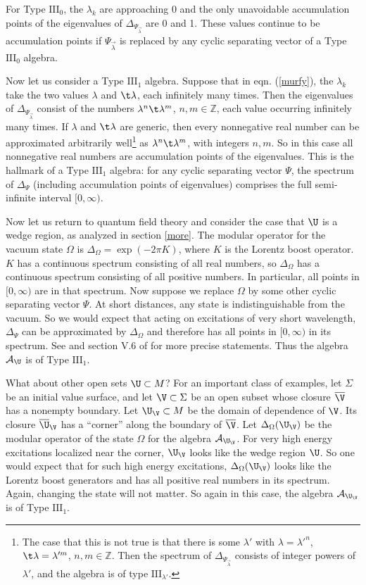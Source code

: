 \documentclass[12pt]{article}
\def\Bbb{\mathbb}
\def\III{{\mathrm{ III}}}
\def\bar{\overline}
\numberwithin{equation}{section}
\def\Z{{\Bbb Z}}
\def\bar{\overline}
\def\A{{\mathcal A}}
\def\bar{\overline}
\begin{document}
For Type $\III_0$, the $\lambda_k$ are approaching 0 and the only unavoidable
accumulation points of the eigenvalues of $\Delta_{\Psi_{\vec\lambda}}$
are 0 and 1.   These values continue to be accumulation points 
if ${\Psi_{\vec\lambda}}$ is replaced by any cyclic separating vector of a Type $\III_0$ algebra.


Now let us consider a Type $\III_1$ algebra.   Suppose that in eqn. (\ref{murfy}), the $\lambda_k$ take the two values $\lambda$ 
and $\t\lambda$, each infinitely many times.  Then the eigenvalues of $\Delta_{\Psi_{\vec\lambda}}$ consist of the numbers 
$\lambda^n\t\lambda^m$, $n,m\in\Z$, each value occurring infinitely many times.   If $\lambda$ and $\t\lambda$ are generic, then
every nonnegative real number can be approximated arbitrarily well\footnote{The case that this is not true is that there is
some $\lambda'$ with $\lambda=\lambda'^n$, $\t\lambda =\lambda'^m$, $n,m\in\Z$.  Then the spectrum of $\Delta_{\Psi_{\vec\lambda}}$ consists of integer powers of $\lambda'$, and the algebra is of type $\III_{\lambda'}$.} 
as $\lambda^n \t\lambda^m$, with integers $n,m$.   So in this
case all nonnegative real numbers are accumulation points of the eigenvalues.   This is the hallmark of a Type $\III_1$ algebra: for
any cyclic separating vector $\Psi$, the spectrum of $\Delta_\Psi$ (including accumulation points of eigenvalues) comprises
the full  semi-infinite interval $[0,\infty)$.  



Now let us return to quantum field theory and consider the case that $\U$ is a wedge region, as analyzed in section \ref{more}.
The modular operator for the vacuum state $\Omega$ is $\Delta_\Omega=\exp(-2\pi K)$, where $K$ is the Lorentz boost operator.
$K$ has a continuous spectrum consisting of all real numbers, so $\Delta_\Omega$ has
a continuous spectrum consisting of all positive numbers.  In particular, all points in $[0,\infty)$ are in that spectrum.  Now suppose we replace $\Omega$ by some other cyclic separating vector $\Psi$.  At short distances, any
state is indistinguishable from the vacuum.  So we would expect that acting on excitations of very short wavelength, $\Delta_\Psi$
can be approximated by $\Delta_\Omega$ and therefore has all points in $[0,\infty)$ in its spectrum. 
See \cite{Fredenhagen} and section V.6 of \cite{Haag} for more precise statements.  Thus the algebra $\A_\U$ is of Type $\III_1$.


What about other open sets $\U\subset M$?
For an important class of examples, 
let $\Sigma$ be an initial value surface, and let $\V\subset \Sigma$ be an open subset whose closure $\bar \V$ has a nonempty
boundary.
 Let $\U_\V\subset M$ be the domain of dependence of $\V$.  Its closure
$\bar\U_\V$ has a ``corner'' along  the boundary  of $\bar\V$. Let $\Delta_\Omega(\U_\V)$ be the modular operator of the state
$\Omega$ for the algebra $\A_{\U_\V}$.   For very high energy excitations localized near the corner, $\U_\V$ looks
like the wedge region $\U$.  So one would expect that for such high energy excitations, $\Delta_\Omega(\U_\V)$ looks like the Lorentz
boost generators and has all positive real numbers in its spectrum.  Again, changing the state will not matter.
So again in this case, the algebra $\A_{\U_\V}$ is of Type $\III_1$.  
\end{document}
